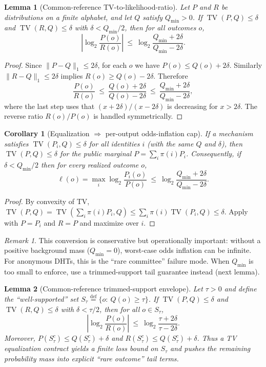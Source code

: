\documentclass[11pt]{article}
\DeclareMathOperator{\TV}{TV}
\newcommand{\defeq}{\stackrel{\mathrm{def}}{=}}
\newtheorem{lemma}{Lemma}
\newtheorem{corollary}{Corollary}
\theoremstyle{definition}
\theoremstyle{remark}
\newtheorem{remark}{Remark}
\begin{document}
\begin{lemma}[Common-reference TV-to-likelihood-ratio]\label{lem:tv_to_lr}
Let $P$ and $R$ be distributions on a finite alphabet, and let $Q$ satisfy $Q_{\min}>0$.
If $\TV(P,Q)\le \delta$ and $\TV(R,Q)\le \delta$ with $\delta<Q_{\min}/2$, then for all outcomes $o$,
\[
\left|\log_2\frac{P(o)}{R(o)}\right|\ \le\ \log_2\frac{Q_{\min}+2\delta}{Q_{\min}-2\delta}.
\]
\end{lemma}

\begin{proof}
Since $\|P-Q\|_1\le 2\delta$, for each $o$ we have $P(o)\le Q(o)+2\delta$.
Similarly $\|R-Q\|_1\le 2\delta$ implies $R(o)\ge Q(o)-2\delta$.
Therefore
\[
\frac{P(o)}{R(o)}\ \le\ \frac{Q(o)+2\delta}{Q(o)-2\delta}
\ \le\ \frac{Q_{\min}+2\delta}{Q_{\min}-2\delta},
\]
where the last step uses that $(x+2\delta)/(x-2\delta)$ is decreasing for $x>2\delta$.
The reverse ratio $R(o)/P(o)$ is handled symmetrically.
\end{proof}

\begin{corollary}[Equalization $\Rightarrow$ per-output odds-inflation cap]\label{cor:eq_to_epsinf}
If a mechanism satisfies $\TV(P_i,Q)\le \delta$ for all identities $i$ (with the same $Q$ and $\delta$),
then $\TV(P,Q)\le \delta$ for the public marginal $P=\sum_i \pi(i)P_i$.
Consequently, if $\delta<Q_{\min}/2$ then for every realized outcome $o$,
\[
\ell(o)=\max_i \log_2\frac{P_i(o)}{P(o)}\ \le\ \log_2\frac{Q_{\min}+2\delta}{Q_{\min}-2\delta}.
\]
\end{corollary}

\begin{proof}
By convexity of TV, $\TV(P,Q)=\TV(\sum_i\pi(i)P_i,Q)\le \sum_i \pi(i)\TV(P_i,Q)\le \delta$.
Apply  with $P=P_i$ and $R=P$ and maximize over $i$.
\end{proof}

\begin{remark}
This conversion is conservative but operationally important: without a positive background mass ($Q_{\min}=0$), worst-case odds inflation can be infinite.
For anonymous DHTs, this is the ``rare committee'' failure mode.
When $Q_{\min}$ is too small to enforce, use a trimmed-support tail guarantee instead (next lemma).
\end{remark}

\begin{lemma}[Common-reference trimmed-support envelope]\label{lem:tv_trimmed}
Let $\tau>0$ and define the ``well-supported'' set $S_\tau\defeq\{o:\ Q(o)\ge \tau\}$.
If $\TV(P,Q)\le \delta$ and $\TV(R,Q)\le \delta$ with $\delta<\tau/2$, then for all $o\in S_\tau$,
\[
\left|\log_2\frac{P(o)}{R(o)}\right|\ \le\ \log_2\frac{\tau+2\delta}{\tau-2\delta}.
\]
Moreover, $P(S_\tau^c)\le Q(S_\tau^c)+\delta$ and $R(S_\tau^c)\le Q(S_\tau^c)+\delta$.
Thus a TV equalization contract yields a finite loss bound on $S_\tau$ and pushes the remaining probability mass into explicit ``rare outcome'' tail terms.
\end{lemma}
\end{document}
